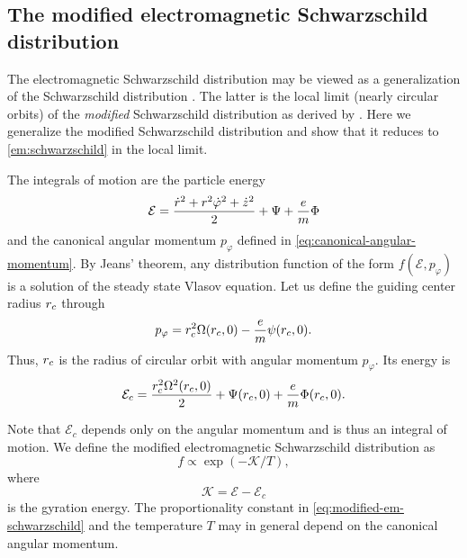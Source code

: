 \documentclass[aps,pre,notitlepage,amsmath,amssymb,amsfonts,nobibnotes,nofootinbib,superscriptaddress]{revtex4-1}
\begin{document}
\subsection{The modified electromagnetic Schwarzschild distribution}

The electromagnetic Schwarzschild distribution 
may be viewed as a generalization of the Schwarzschild distribution
\citep[e.g.][]{Julian1966}. The latter is the local limit (nearly circular
orbits) of the \emph{modified} Schwarzschild distribution as derived by
\citet{Shu1969}. Here we generalize the modified Schwarzschild distribution
and show that it reduces to \cref{em:schwarzschild} in the local limit.

The integrals of motion are the particle energy
\begin{equation}
  \mathcal{E} = \frac{\dot{r}^2 + r^2\dot{\varphi}^2 + \dot{z}^2}{2}
  + \Psi + \frac{e}{m}\Phi
\end{equation}
and the canonical angular momentum $p_\varphi$ defined in
\cref{eq:canonical-angular-momentum}.  By Jeans' theorem, any distribution
function of the form $f(\mathcal{E},p_\varphi)$ is a solution of the steady
state Vlasov equation. Let us define the guiding center radius $r_c$ through
\begin{equation}
  p_\varphi = r_c^2\Omega(r_c,0) - \frac{e}{m}\psi(r_c,0).
\end{equation}
Thus, $r_c$ is the radius of circular orbit with angular momentum $p_\varphi$.
Its energy is
\begin{equation}
  \mathcal{E}_c = \frac{r_c^2\Omega^2(r_c,0)}{2}
  + \Psi(r_c,0) + \frac{e}{m}\Phi(r_c,0).
\end{equation}

Note that $\mathcal{E}_c$ depends only on the angular momentum and is thus an
integral of motion. We define the modified electromagnetic Schwarzschild
distribution as
\begin{equation}
  \label{eq:modified-em-schwarzschild}
  f \propto \exp(-\mathcal{K}/T),
\end{equation}
where
\begin{equation}
  \label{eq:global-gyration-energy}
  \mathcal{K} = \mathcal{E} - \mathcal{E}_c
\end{equation}
is the gyration energy. The proportionality constant in
\cref{eq:modified-em-schwarzschild} and the temperature $T$ may in general
depend on the canonical angular momentum.
\end{document}

